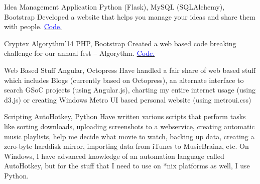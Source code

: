     {Idea Management Application}
    {}
    {\scriptsize Python (Flask), MySQL (SQLAlchemy), Bootstrap}
    {}
    {
        Developed a website that helps you manage your ideas and share them with people.
        \href{http://github.com/ideabin/ideabin/}{\textcolor{blue}{\scriptsize Code.}}
    }
    \vspace*{0.2\baselineskip}

    {Cryptex}
    {Algorythm'14}
    {\scriptsize PHP, Bootstrap}
    {}
    {
        Created a web based code breaking challenge for our annual fest -- Algorythm.
        \href{http://github.com/jdevlabs/cryptex/}{\textcolor{blue}{\scriptsize Code.}}
    }
    \vspace*{0.2\baselineskip}

\cventry{}
    {Web Based Stuff}
    {}
    {\scriptsize Angular, Octopress}
    {}
    {
        Have handled a fair share of web based stuff which includes Blogs (currently based on Octopress), an alternate interface to search GSoC projects (using Angular.js), charting my entire internet usage (using d3.js) or creating Windows Metro UI based personal website (using metroui.css)
    }
    \vspace*{0.2\baselineskip}

\cventry{}
    {Scripting}
    {}
    {\scriptsize AutoHotkey, Python}
    {}
    {
        Have written various scripts that perform tasks like sorting downloads, uploading screenshots to a webservice, creating automatic music playlists, help me decide what movie to watch, backing up data, creating a zero-byte harddisk mirror, importing data from iTunes to MusicBrainz, etc.
        On Windows, I have advanced knowledge of an automation language called AutoHotkey, but for the stuff that I need to use on *nix platforms as well, I use Python.
    }
    \vspace*{0.2\baselineskip}
